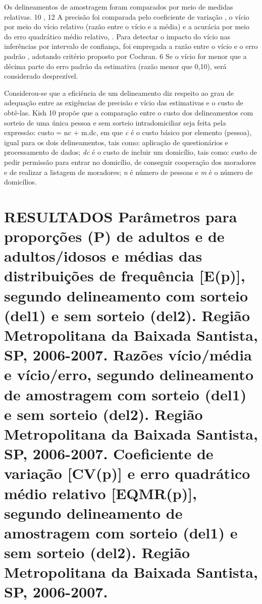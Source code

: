 \documentclass{article}
\begin{document}
Os delineamentos de amostragem foram comparados por meio de medidas relativas.%
10%
,%
12%
 A precisão foi comparada pelo coeficiente de variação %
, o vício por meio do vício relativo (razão entre o vício e a média)%
 e a acurácia por meio do erro quadrático médio relativo, %
. Para detectar o impacto do vício nas inferências por intervalo de confiança, foi empregada a razão entre o vício e o erro padrão %
, adotando critério proposto por Cochran.%
6%
 Se o vício for menor que a décima parte do erro padrão da estimativa (razão menor que 0,10), será considerado desprezível.

Considerou-se que a eficiência de um delineamento diz respeito ao grau de adequação entre as exigências de precisão e vício das estimativas e o custo de obtê-las. Kish%
10%
 propõe que a comparação entre o custo dos delineamentos com sorteio de uma única pessoa e sem sorteio intradomiciliar seja feita pela expressão: custo = nc + m.dc, em que %
\textit{c}
 é o custo básico por elemento (pessoa), igual para os dois delineamentos, tais como: aplicação de questionários e processamento de dados; %
\textit{dc}
 é o custo de incluir um domicílio, tais como: custo de pedir permissão para entrar no domicílio, de conseguir cooperação dos moradores e de realizar a listagem de moradores; %
\textit{n}
 é número de pessoas e %
\textit{m}
 é o número de domicílios.


\section{%
RESULTADOS%
Parâmetros para proporções (P) de adultos e de adultos/idosos e médias das distribuições de frequência [E(p)], segundo delineamento com sorteio (del1) e sem sorteio (del2). Região Metropolitana da Baixada Santista, SP, 2006-2007.%
Razões vício/média e vício/erro, segundo delineamento de amostragem com sorteio (del1) e sem sorteio (del2). Região Metropolitana da Baixada Santista, SP, 2006-2007.%
Coeficiente de variação [CV(p)] e erro quadrático médio relativo [EQMR(p)], segundo delineamento de amostragem com sorteio (del1) e sem sorteio (del2). Região Metropolitana da Baixada Santista, SP, 2006-2007.}
\end{document}
